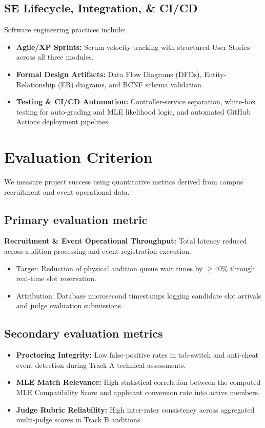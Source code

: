 \documentclass[11pt,a4paper]{article}
\begin{document}
\subsection{SE Lifecycle, Integration, \& CI/CD}
Software engineering practices include:
\begin{itemize}[leftmargin=0.7cm]
    \item \textbf{Agile/XP Sprints:} Scrum velocity tracking with structured User Stories across all three modules.
    \item \textbf{Formal Design Artifacts:} Data Flow Diagrams (DFDs), Entity-Relationship (ER) diagrams, and BCNF schema validation.
    \item \textbf{Testing \& CI/CD Automation:} Controller-service separation, white-box testing for auto-grading and MLE likelihood logic, and automated GitHub Actions deployment pipelines.
\end{itemize}

\section{Evaluation Criterion}
We measure project success using quantitative metrics derived from campus recruitment and event operational data.

\subsection{Primary evaluation metric}
\textbf{Recruitment \& Event Operational Throughput:} Total latency reduced across audition processing and event registration execution.
\begin{itemize}[leftmargin=0.7cm]
    \item Target: Reduction of physical audition queue wait times by $\ge 40\%$ through real-time slot reservation.
    \item Attribution: Database microsecond timestamps logging candidate slot arrivals and judge evaluation submissions.
\end{itemize}

\subsection{Secondary evaluation metrics}
\begin{itemize}[leftmargin=0.7cm]
    \item \textbf{Proctoring Integrity:} Low false-positive rates in tab-switch and anti-cheat event detection during Track A technical assessments.
    \item \textbf{MLE Match Relevance:} High statistical correlation between the computed MLE Compatibility Score and applicant conversion rate into active members.
    \item \textbf{Judge Rubric Reliability:} High inter-rater consistency across aggregated multi-judge scores in Track B auditions.
\end{itemize}
\end{document}
